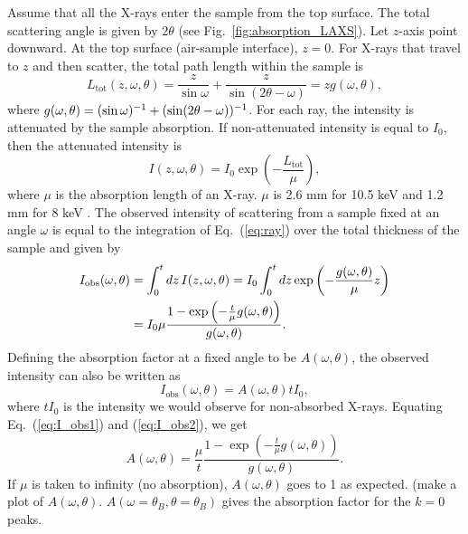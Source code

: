 Assume that all the X-rays enter the sample from the top surface. The total scattering
angle is given by $2\theta$ (see Fig.~\ref{fig:absorption_LAXS}).
Let $z$-axis point downward. At the top surface
(air-sample interface), $z=0$. For X-rays that travel to $z$ and then scatter, the
total path length within the sample is 
\begin{equation}
  L_\textrm{tot}(z,\omega,\theta) 
  = \frac{z}{\sin\omega}+\frac{z}{\sin(2\theta-\omega)} 
  = zg(\omega,\theta),
\end{equation}
where $g(\omega,\theta)=(\sin\omega)^{-1}+\mathopen{}\left( \sin\mathopen{}\left( 2\theta-\omega \right)\mathclose{} \right)\mathclose{}^{-1}$.
For each ray, the intensity is attenuated by the sample absorption. 
If non-attenuated 
intensity is equal to $I_0$, then the attenuated intensity is
\begin{equation}
  I(z,\omega,\theta) = I_0\exp\left(-\frac{L_\textrm{tot}}{\mu}\right),
  \label{eq:ray}
\end{equation}
where $\mu$ is the absorption length of an X-ray. $\mu$ is 2.6 mm for 10.5 keV
and 1.2 mm for 8 keV \cite{ref:cxro}.
The observed intensity of scattering from a sample fixed at an angle $\omega$ 
is equal to the integration
of Eq.~(\ref{eq:ray}) over the total thickness of the sample and given by
\begin{align}
  I_{\textrm{obs}}(\omega,\theta) 
    &= \int_0^t \mathop{dz} I(z,\omega,\theta)
     = I_0\int_0^t\mathop{dz} \exp\left(-\frac{g(\omega,\theta)}{\mu}z\right) \nonumber \\
    &= I_0\mu \frac{1-\exp\left(-\frac{t}{\mu}g(\omega,\theta)\right)}{g(\omega,\theta)}.
    \label{eq:I_obs1}
\end{align}
Defining the absorption factor at a fixed angle to be $A(\omega,\theta)$, 
the observed intensity can also be written as
\begin{equation}
I_{\textrm{obs}}(\omega,\theta)=A(\omega,\theta)tI_0,
\label{eq:I_obs2}
\end{equation}
where $tI_0$ is the intensity we would observe for non-absorbed X-rays.
Equating Eq.~(\ref{eq:I_obs1}) and (\ref{eq:I_obs2}), we get
\begin{equation}
  A(\omega,\theta) = \frac{\mu}{t} 
                     \frac{1-\exp\left(-\frac{t}{\mu}g(\omega,\theta)\right)}{g(\omega,\theta)}.
  \label{eq:ang_abs_factor}
\end{equation}
If $\mu$ is taken to infinity (no absorption), $A(\omega,\theta)$ 
goes to 1 as expected. (make a plot of $A(\omega,\theta)$.
$A(\omega=\theta_B,\theta=\theta_B)$ gives the absorption factor for
the $k=0$ peaks.


